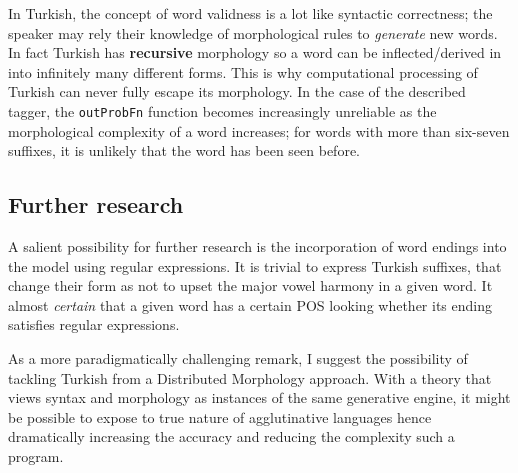 \documentclass{article}
\begin{document}
In Turkish, the concept of word validness is a lot like syntactic correctness;
the speaker may rely their knowledge of morphological rules to \emph{generate}
new words. In fact Turkish has \textbf{recursive} morphology \citep{kabak2001}
so a word can be inflected/derived in into infinitely many different forms. This
is why computational processing of Turkish can never fully escape its
morphology. In the case of the described tagger, the \texttt{outProbFn} function
becomes increasingly unreliable as the morphological complexity of a word
increases; for words with more than six-seven suffixes, it is unlikely that the
word has been seen before.

\subsection{Further research}

A salient possibility for further research is the incorporation of word endings
into the model using regular expressions. It is trivial to express Turkish
suffixes, that change their form as not to upset the major vowel harmony in a
given word. It almost \emph{certain} that a given word has a certain POS looking
whether its ending satisfies regular expressions.

As a more paradigmatically challenging remark, I suggest the possibility of
tackling Turkish from a Distributed Morphology \citep{halle1993distributed}
approach. With a theory that views syntax and morphology as instances of the
same generative engine, it might be possible to expose to true nature of
agglutinative languages hence dramatically increasing the accuracy and reducing
the complexity such a program. 

\end{document}
